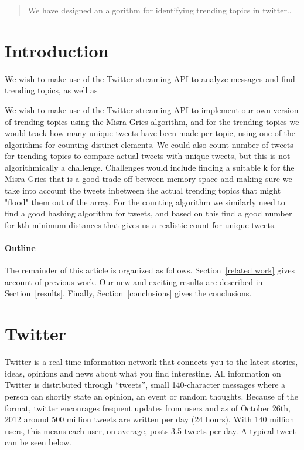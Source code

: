\documentclass[12pt]{article}
\begin{document}
\maketitle

\begin{abstract}
We have designed an algorithm for identifying trending topics in twitter..
\end{abstract}

\section{Introduction}
We wish to make use of the Twitter streaming API to analyze messages and find trending topics, as well as

We wish to make use of the Twitter streaming API to implement our own version of trending topics using the Misra-Gries algorithm, and for the trending topics we would track how many unique tweets have been made per topic, using one of the algorithms for counting distinct elements. We could also count number of tweets for trending topics to compare actual tweets with unique tweets, but this is not algorithmically a challenge.
\newline\newline
Challenges would include finding a suitable k for the Misra-Gries that is a good trade-off between memory space and making sure we take into account the tweets inbetween the actual trending topics that might "flood" them out of the array.
\newline\newline
For the counting algorithm we similarly need to find a good hashing algorithm for tweets, and based on this find a good number for kth-minimum distances that gives us a realistic count for unique tweets.

\paragraph{Outline}
The remainder of this article is organized as follows.
Section~\ref{related work} gives account of previous work.
Our new and exciting results are described in Section~\ref{results}.
Finally, Section~\ref{conclusions} gives the conclusions.


\section{Twitter}
Twitter is a real-time information network that connects you to the latest stories, ideas, opinions and news about what you find interesting. All information on Twitter is distributed through ``tweets'', small 140-character messages where a person can shortly state an opinion, an event or random thoughts. Because of the format, twitter encourages frequent updates from users and as of October 26th, 2012 around 500 million tweets are written per day (24 hours)\cite{Cnet1}. With 140 million users, this means each user, on average, posts 3.5 tweets per day. A typical tweet can be seen below.
\end{document}
